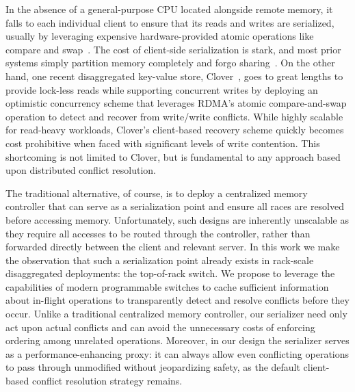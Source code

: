 

In the absence of a general-purpose CPU located alongside remote
memory, it falls to each individual client to ensure that its reads
and writes are serialized, usually by leveraging expensive
hardware-provided atomic operations like compare and
swap~\cite{design-guidelines,clover}.  The cost of client-side
serialization is stark, and most prior systems simply partition memory
completely and forgo sharing~\cite{reigons,fastswap, legoos}.  On the
other hand, one recent disaggregated key-value store,
Clover~\cite{clover}, goes to great lengths to provide lock-less reads
while supporting concurrent writes by deploying an optimistic
concurrency scheme that leverages RDMA's atomic compare-and-swap
operation to detect and recover from write/write conflicts.  While
highly scalable for read-heavy workloads, Clover's client-based
recovery scheme quickly becomes cost prohibitive when faced with
significant levels of write contention.  This shortcoming is not
limited to Clover, but is fundamental to any approach based upon
distributed conflict resolution.


The traditional alternative, of course, is to deploy a centralized
memory controller that can serve as a serialization point and ensure
all races are resolved before accessing memory.  Unfortunately, such
designs are inherently unscalable as they require all accesses to be
routed through the controller, rather than forwarded directly between
the client and relevant server.  In this work we make the observation
that such a serialization point already exists in rack-scale
disaggregated deployments: the top-of-rack switch.  We propose to
leverage the capabilities of modern programmable switches to cache
sufficient information about in-flight operations to transparently
detect and resolve conflicts before they occur.  Unlike a traditional
centralized memory controller, our serializer need only act upon
actual conflicts and can avoid the unnecessary costs of enforcing
ordering among unrelated operations.  Moreover, in our design the
serializer serves as a performance-enhancing proxy: it can always
allow even conflicting operations to pass through unmodified without
jeopardizing safety, as the default client-based conflict resolution
strategy remains.

